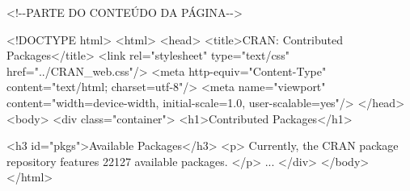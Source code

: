 \documentclass[
  12pt,
  a4paper,
]{scrreprt}
\newenvironment{Shaded}{}{}
\newcommand{\CommentTok}[1]{\textcolor[rgb]{0.42,0.45,0.49}{#1}}
\newcommand{\DataTypeTok}[1]{\textcolor[rgb]{0.84,0.23,0.29}{#1}}
\newcommand{\KeywordTok}[1]{\textcolor[rgb]{0.84,0.23,0.29}{#1}}
\newcommand{\NormalTok}[1]{\textcolor[rgb]{0.14,0.16,0.18}{#1}}
\newcommand{\OperatorTok}[1]{\textcolor[rgb]{0.14,0.16,0.18}{#1}}
\newcommand{\OtherTok}[1]{\textcolor[rgb]{0.44,0.26,0.76}{#1}}
\newcommand{\StringTok}[1]{\textcolor[rgb]{0.01,0.18,0.38}{#1}}
\begin{document}
\begin{Shaded}
\begin{Highlighting}[]
\CommentTok{\textless{}!{-}{-}PARTE DO CONTEÚDO DA PÁGINA{-}{-}\textgreater{}}

\DataTypeTok{\textless{}!DOCTYPE}\NormalTok{ html}\DataTypeTok{\textgreater{}}
\DataTypeTok{\textless{}}\KeywordTok{html}\DataTypeTok{\textgreater{}}
\DataTypeTok{\textless{}}\KeywordTok{head}\DataTypeTok{\textgreater{}}
    \DataTypeTok{\textless{}}\KeywordTok{title}\DataTypeTok{\textgreater{}}\NormalTok{CRAN: Contributed Packages}\DataTypeTok{\textless{}/}\KeywordTok{title}\DataTypeTok{\textgreater{}}
    \DataTypeTok{\textless{}}\KeywordTok{link}\OtherTok{ rel}\OperatorTok{=}\StringTok{"stylesheet"}\OtherTok{ type}\OperatorTok{=}\StringTok{"text/css"}\OtherTok{ href}\OperatorTok{=}\StringTok{"../CRAN\_web.css"}\DataTypeTok{/\textgreater{}}
    \DataTypeTok{\textless{}}\KeywordTok{meta}\OtherTok{ http{-}equiv}\OperatorTok{=}\StringTok{"Content{-}Type"}
\OtherTok{     content}\OperatorTok{=}\StringTok{"text/html; charset=utf{-}8"}\DataTypeTok{/\textgreater{}}
    \DataTypeTok{\textless{}}\KeywordTok{meta}\OtherTok{ name}\OperatorTok{=}\StringTok{"viewport"}\OtherTok{ content}\OperatorTok{=}\StringTok{"width=device{-}width,}
\StringTok{     initial{-}scale=1.0, user{-}scalable=yes"}\DataTypeTok{/\textgreater{}}
\DataTypeTok{\textless{}/}\KeywordTok{head}\DataTypeTok{\textgreater{}}
\DataTypeTok{\textless{}}\KeywordTok{body}\DataTypeTok{\textgreater{}}
    \DataTypeTok{\textless{}}\KeywordTok{div}\OtherTok{ class}\OperatorTok{=}\StringTok{"container"}\DataTypeTok{\textgreater{}}
        \DataTypeTok{\textless{}}\KeywordTok{h1}\DataTypeTok{\textgreater{}}\NormalTok{Contributed Packages}\DataTypeTok{\textless{}/}\KeywordTok{h1}\DataTypeTok{\textgreater{}}

        \DataTypeTok{\textless{}}\KeywordTok{h3}\OtherTok{ id}\OperatorTok{=}\StringTok{"pkgs"}\DataTypeTok{\textgreater{}}\NormalTok{Available Packages}\DataTypeTok{\textless{}/}\KeywordTok{h3}\DataTypeTok{\textgreater{}}
        \DataTypeTok{\textless{}}\KeywordTok{p}\DataTypeTok{\textgreater{}}
\NormalTok{            Currently, the CRAN package repository features}
\NormalTok{            22127 available packages.}
        \DataTypeTok{\textless{}/}\KeywordTok{p}\DataTypeTok{\textgreater{}}
\NormalTok{        ...}
    \DataTypeTok{\textless{}/}\KeywordTok{div}\DataTypeTok{\textgreater{}}
\DataTypeTok{\textless{}/}\KeywordTok{body}\DataTypeTok{\textgreater{}}
\DataTypeTok{\textless{}/}\KeywordTok{html}\DataTypeTok{\textgreater{}}
\end{Highlighting}
\end{Shaded}
\end{document}
